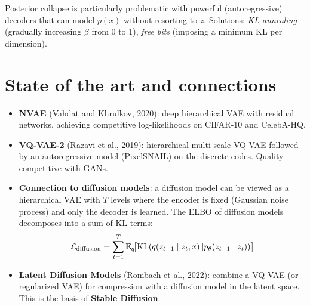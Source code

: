 \begin{warning}
Posterior collapse is particularly problematic with powerful (autoregressive) decoders that can model $p(x)$ without resorting to $z$. Solutions: \emph{KL annealing} (gradually increasing $\beta$ from 0 to 1), \emph{free bits} (imposing a minimum KL per dimension).
\end{warning}

\section{State of the art and connections}
\label{sec:vae-sota}

\begin{sota}[title=\textbf{Extensions and successors of VAEs}]
\begin{itemize}
    \item \textbf{NVAE} (Vahdat and Khrulkov, 2020): deep hierarchical VAE with residual networks, achieving competitive log-likelihoods on CIFAR-10 and CelebA-HQ.

    \item \textbf{VQ-VAE-2} (Razavi et al., 2019): hierarchical multi-scale VQ-VAE followed by an autoregressive model (PixelSNAIL) on the discrete codes. Quality competitive with GANs.

    \item \textbf{Connection to diffusion models}: a diffusion model can be viewed as a hierarchical VAE with $T$ levels where the encoder is fixed (Gaussian noise process) and only the decoder is learned. The ELBO of diffusion models decomposes into a sum of KL terms:
    \begin{equation}
    \mathcal{L}_{\text{diffusion}} = \sum_{t=1}^{T} \mathbb{E}_q\!\big[\mathrm{KL}(q(z_{t-1} \mid z_t, x) \| p_\theta(z_{t-1} \mid z_t))\big]
    \end{equation}

    \item \textbf{Latent Diffusion Models} (Rombach et al., 2022): combine a VQ-VAE (or regularized VAE) for compression with a diffusion model in the latent space. This is the basis of \textbf{Stable Diffusion}.
\end{itemize}
\end{sota}


